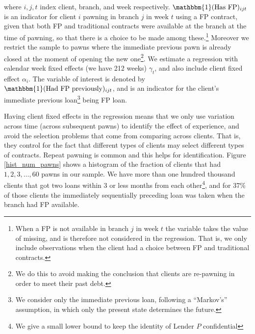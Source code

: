 \documentclass[oneside,11pt]{article}
\begin{document}
\noindent where $i,j,t$ index client, branch, and week respectively. $\mathbbm{1}(\text{Has FP})_{ijt}$ is an indicator for client $i$ pawning in branch $j$ in week $t$ using a FP contract, given that both FP and traditional contracts were available at the branch at the time of pawning, so that there is a choice to be made among these.\footnote{When a FP is not available in branch $j$ in week $t$ the variable takes the value of missing, and is therefore not considered in the regression. That is, we only include observations when the client had a choice between FP and traditional contracts.} Moreover we restrict the sample to pawns where the immediate previous pawn is already closed at the moment of opening the new one\footnote{We do this to avoid making the conclusion that clients are re-pawning in order to meet their past debt.}. We estimate a regression with calendar week fixed effects (we have 212 weeks) $\gamma_t$, and also include client fixed effect $\alpha_i$.  The variable of interest is denoted by $\mathbbm{1}(\text{Had FP previously})_{ijt}$, and is an indicator for the client's immediate previous loan\footnote{We consider only the immediate previous loan, following a ``Markov's'' assumption, in which only the present state determines the future.} being FP loan. 

Having client fixed effects in the regression means that we only use variation across time (across subsequent pawns) to identify the effect of experience, and avoid the selection problems that come from comparing across clients. That is, they control for the fact that different types of clients may select different types of contracts. Repeat pawning is common and this helps for identification. Figure \ref{hist_num_pawns} shows a histogram of the fraction of clients that had $1, 2, 3,\ldots, 60$ pawns in our sample. We have more than one hundred thousand clients that got two loans within 3 or less months from each other\footnote{We give a small lower bound to keep the identity of Lender $P$ confidential}, and for 37\% of those clients the immediately sequentially preceding loan was taken when the branch had FP available.\\
\end{document}
